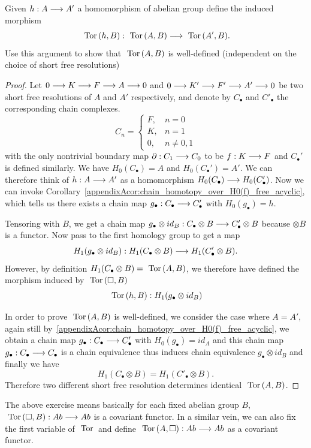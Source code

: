 \documentclass[11pt]{book} %
\begin{document}
\begin{exr}\label{chap11exr:tor_functor}
Given $h: A\longrightarrow A'$ a homomorphism of abelian group define the induced morphism
$$
\text{ Tor\,}(h, B): \text{ Tor\,} (A,B)\longrightarrow \text{ Tor\,}(A',B).
$$ 
Use this argument to show that $\text{ Tor\,}(A, B)$ is well-defined (independent on the choice of short free resolutions)
\end{exr}
\begin{proof}
Let $0\longrightarrow K\longrightarrow F\longrightarrow A\longrightarrow 0$ and $0\longrightarrow K'\longrightarrow F'\longrightarrow A'\longrightarrow 0$ be two short free resolutions of $A$ and $A'$ respectively, and denote by $C_\bullet$ and $C'_\bullet$ the corresponding chain complexes. 
$$
C_n=\left\{ \begin{aligned}
F, & n=0\\
K, & n=1\\
0, & n\neq 0,1
\end{aligned}
\right.
$$
with the only nontrivial boundary map ${\partial}: C_1\longrightarrow C_0$ to be $f: K\longrightarrow F$ and $C_\bullet'$ is defined similarly. We have $H_0(C_\bullet)=A$ and $H_0(C_\bullet')=A'$. We can therefore think of $h: A\longrightarrow A'$ as a homomorphism $H_0(C_\bullet)\longrightarrow H_0(C_\bullet')$. Now we can invoke Corollary~\ref{appendixAcor:chain_homotopy_over_H0(f)_free_acyclic}, which tells us there exists a chain map $g_\bullet: C_\bullet\longrightarrow C_\bullet'$ with $H_0(g_\bullet)=h$. 

Tensoring with $B$, we get a chain map $g_\bullet\otimes id_B:C_\bullet\otimes B\longrightarrow C_\bullet'\otimes B$ because $\otimes B$ is a functor. Now pass to the first homology group to get a map
$$
H_1(g_\bullet\otimes id_B): H_1(C_\bullet\otimes B)\longrightarrow H_1(C_\bullet'\otimes B).
$$
However, by definition $H_1(C_\bullet\otimes B)=\text{ Tor\,}(A,B)$, we therefore have defined the morphism induced by $\text{ Tor\,}(\square,B)$
$$
\text{ Tor\,}(h,B):H_1(g_\bullet\otimes id_B)
$$

In order to prove $\text{ Tor\,}(A,B)$ is well-defined, we consider the case where $A=A'$, again still by~\ref{appendixAcor:chain_homotopy_over_H0(f)_free_acyclic}, we obtain a chain map $g_\bullet: C_\bullet\longrightarrow C_\bullet'$ with $H_0(g_\bullet)=id_A$ and this chain map $g_\bullet: C_\bullet\longrightarrow C_\bullet$ is a chain equivalence thus induces chain equivalence $g_\bullet\otimes id_B$ and finally we have 
$$
H_1(C_\bullet\otimes B)=H_1(C'_\bullet\otimes B).
$$
Therefore two different short free resolution determines identical $\text{ Tor\,}(A,B)$.
\end{proof}
\begin{remark}
The above exercise means basically for each fixed abelian group $B$, $\text{ Tor\,}(\square, B):Ab\longrightarrow Ab$ is a covariant functor. In a similar vein, we can also fix the first variable of $\text{ Tor\,}$ and define $\text{ Tor\,}(A,\square): Ab\longrightarrow Ab$ as a covariant functor. 
\end{remark}
\end{document}
